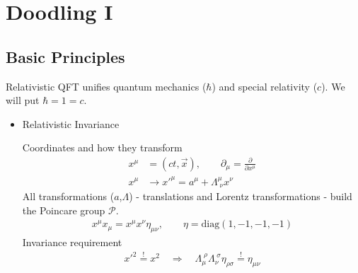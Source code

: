 \documentclass[10pt,a4paper]{book}
\theoremstyle{definition}
\begin{document}
\chapter{Doodling I}
\section{Basic Principles}
Relativistic QFT unifies quantum mechanics ($\hbar$) and special relativity ($c$). We will put $\hbar=1=c$.
\begin{itemize}
\item Relativistic Invariance

Coordinates and how they transform
\begin{align}
x^\mu&=(ct,\vec{x}), \qquad \partial_\mu=\frac{\partial}{\partial x^\mu}\\
x^\mu&\rightarrow x'^{\mu}=a^\mu+\Lambda^\mu_{\;\nu}x^\nu
\end{align}
All transformations ($a$,$\Lambda$) - translations and Lorentz transformations - build the Poincare group $\mathcal{P}$.
\begin{align}
x^\mu x_\mu=x^\mu x^\nu\eta_{\mu\nu}, \qquad \eta=\text{diag}(1,-1,-1,-1)
\end{align}
Invariance requirement
\begin{align}
x'^2\overset{!}{=}x^2\quad\Rightarrow\quad \Lambda_\mu^{\;\rho}\Lambda_\nu^{\;\sigma}\eta_{\rho\sigma}\overset{!}{=}\eta_{\mu\nu}
\end{align}
\end{itemize}
\end{document}
